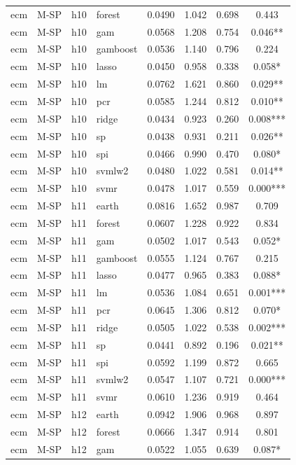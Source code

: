 \begin{ThreePartTable}
\begin{longtable}[t]{llclcccc}
ecm & M-SP & h10 & forest & 0.0490 & 1.042 & 0.698 & 0.443\\
ecm & M-SP & h10 & gam & 0.0568 & 1.208 & 0.754 & 0.046**\\
ecm & M-SP & h10 & gamboost & 0.0536 & 1.140 & 0.796 & 0.224\\
ecm & M-SP & h10 & lasso & 0.0450 & 0.958 & 0.338 & 0.058*\\
ecm & M-SP & h10 & lm & 0.0762 & 1.621 & 0.860 & 0.029**\\
ecm & M-SP & h10 & pcr & 0.0585 & 1.244 & 0.812 & 0.010**\\
ecm & M-SP & h10 & ridge & 0.0434 & 0.923 & 0.260 & 0.008***\\
ecm & M-SP & h10 & sp & 0.0438 & 0.931 & 0.211 & 0.026**\\
ecm & M-SP & h10 & spi & 0.0466 & 0.990 & 0.470 & 0.080*\\
ecm & M-SP & h10 & svmlw2 & 0.0480 & 1.022 & 0.581 & 0.014**\\
ecm & M-SP & h10 & svmr & 0.0478 & 1.017 & 0.559 & 0.000***\\
\addlinespace
ecm & M-SP & h11 & earth & 0.0816 & 1.652 & 0.987 & 0.709\\
ecm & M-SP & h11 & forest & 0.0607 & 1.228 & 0.922 & 0.834\\
ecm & M-SP & h11 & gam & 0.0502 & 1.017 & 0.543 & 0.052*\\
ecm & M-SP & h11 & gamboost & 0.0555 & 1.124 & 0.767 & 0.215\\
ecm & M-SP & h11 & lasso & 0.0477 & 0.965 & 0.383 & 0.088*\\
ecm & M-SP & h11 & lm & 0.0536 & 1.084 & 0.651 & 0.001***\\
ecm & M-SP & h11 & pcr & 0.0645 & 1.306 & 0.812 & 0.070*\\
ecm & M-SP & h11 & ridge & 0.0505 & 1.022 & 0.538 & 0.002***\\
ecm & M-SP & h11 & sp & 0.0441 & 0.892 & 0.196 & 0.021**\\
ecm & M-SP & h11 & spi & 0.0592 & 1.199 & 0.872 & 0.665\\
ecm & M-SP & h11 & svmlw2 & 0.0547 & 1.107 & 0.721 & 0.000***\\
ecm & M-SP & h11 & svmr & 0.0610 & 1.236 & 0.919 & 0.464\\
\addlinespace
ecm & M-SP & h12 & earth & 0.0942 & 1.906 & 0.968 & 0.897\\
ecm & M-SP & h12 & forest & 0.0666 & 1.347 & 0.914 & 0.801\\
ecm & M-SP & h12 & gam & 0.0522 & 1.055 & 0.639 & 0.087*\\

\end{longtable}
\end{ThreePartTable}
